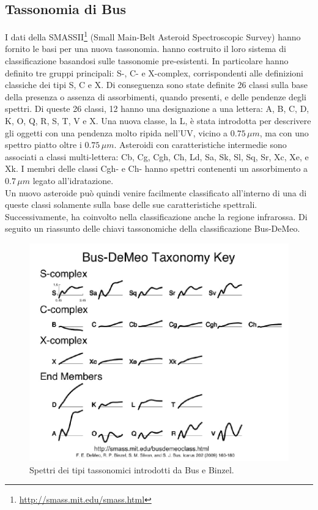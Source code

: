 \documentclass[a4paper,11pt,openright]{book}
\begin{document}
\subsection{Tassonomia di Bus}
I dati della SMASSII\footnote{\href{http://smass.mit.edu/smass.html}{http://smass.mit.edu/smass.html}} (Small Main-Belt Asteroid Spectroscopic Survey) hanno fornito le basi per una nuova tassonomia. \citet{bus_phase_2002, bus_phase_2002-1} hanno costruito il loro sistema di classificazione basandosi sulle tassonomie pre-esistenti. In particolare hanno definito tre gruppi principali: S-, C- e X-complex, corrispondenti alle definizioni classiche dei tipi S, C e X. Di conseguenza sono state definite 26 classi sulla base della presenza o assenza di assorbimenti, quando presenti, e delle pendenze degli spettri. Di queste 26 classi, 12 hanno una designazione a una lettera: A, B, C, D, K, O, Q, R, S, T, V e X. Una nuova classe, la L, è stata introdotta per descrivere gli oggetti con una pendenza molto ripida nell'UV, vicino a $0.75\,\mu m$, ma con uno spettro piatto oltre i $0.75\,\mu m$. Asteroidi con caratteristiche intermedie sono associati a classi multi-lettera: Cb, Cg, Cgh, Ch, Ld, Sa, Sk, Sl, Sq, Sr, Xc, Xe, e Xk. I membri delle classi Cgh- e Ch- hanno spettri contenenti un assorbimento a $0.7\,\mu m$ legato all'idratazione.\\
Un nuovo asteroide può quindi venire facilmente classificato all’interno di una di queste classi solamente sulla base delle sue caratteristiche spettrali. Successivamente, \citet{demeo_extension_2009} ha coinvolto nella classificazione anche la regione infrarossa. Di seguito un riassunto delle chiavi tassonomiche della classificazione Bus-DeMeo.

\begin{figure}[!ht]
    \centering
    \includegraphics[scale=0.44]{figure/spettro_bus.jpg}
    \caption[Spettri dei tipi tassonomici introdotti da Bus e Binzel.]{Spettri dei tipi tassonomici introdotti da Bus e Binzel. \citep{demeo_extension_2009}}
    \label{spettro_bus}
\end{figure}
\end{document}
